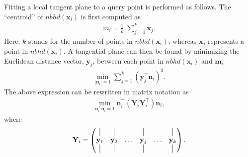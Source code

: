 Fitting a local tangent plane to a query point is performed as follows.
The ``centroid'' of $nbhd(\mathbf{x}_i)$ is first computed as
\begin{align}
    m_i = \frac{1}{k} \; \sum_{j=1}^{k} \mathbf{x}_j.
\end{align}
Here, $k$ stands for the number of points in $nbhd(\mathbf{x}_i)$, whereas $\mathbf{x}_j$ represents a point in $nbhd(\mathbf{x}_i)$.
A tangential plane can then be found by minimizing the Euclidean distance vector, $\mathbf{y}_j$, between each point in $nbhd(\mathbf{x}_i)$ and $\mathbf{m}_i$
\begin{align}
    \label{eqn:constrained_1}
    \min_{\left| \mathbf{n}_i \right| = 1} \sum_{j=1}^{k} \left( \mathbf{y}_j^\intercal \mathbf{n}_i \right)^2.
\end{align}
The above expression can be rewritten in matrix notation as
\begin{align}
    \label{eqn:constrained_2}
    \min_{ \mathbf{n}_i^\intercal \mathbf{n}_i = 1} \mathbf{n}_i^\intercal \left( \mathbf{Y}_i \mathbf{Y}_i^\intercal \right) \mathbf{n}_i,
\end{align}
where
\begin{align}
    \mathbf{Y}_i = \begin{pmatrix}
    \vline & \vline &  & \vline &  & \vline \\
    \mathbf{y}_1 & \mathbf{y}_2 & \dots & \mathbf{y}_j & \dots & \mathbf{y}_k \\
    \vline & \vline &  & \vline &  & \vline
    \end{pmatrix}.
\end{align}


